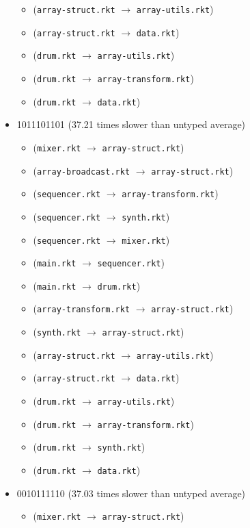 \documentclass{article}
\newcommand{\mono}[1]{\texttt{#1}}
\begin{document}
\begin{itemize}
\begin{itemize}
  \item (\mono{array-struct.rkt} $\rightarrow$ \mono{array-utils.rkt})
  \item (\mono{array-struct.rkt} $\rightarrow$ \mono{data.rkt})
  \item (\mono{drum.rkt} $\rightarrow$ \mono{array-utils.rkt})
  \item (\mono{drum.rkt} $\rightarrow$ \mono{array-transform.rkt})
  \item (\mono{drum.rkt} $\rightarrow$ \mono{data.rkt})
  \end{itemize}
\item 1011101101 (37.21 times slower than untyped average)
  \begin{itemize}
  \item (\mono{mixer.rkt} $\rightarrow$ \mono{array-struct.rkt})
  \item (\mono{array-broadcast.rkt} $\rightarrow$ \mono{array-struct.rkt})
  \item (\mono{sequencer.rkt} $\rightarrow$ \mono{array-transform.rkt})
  \item (\mono{sequencer.rkt} $\rightarrow$ \mono{synth.rkt})
  \item (\mono{sequencer.rkt} $\rightarrow$ \mono{mixer.rkt})
  \item (\mono{main.rkt} $\rightarrow$ \mono{sequencer.rkt})
  \item (\mono{main.rkt} $\rightarrow$ \mono{drum.rkt})
  \item (\mono{array-transform.rkt} $\rightarrow$ \mono{array-struct.rkt})
  \item (\mono{synth.rkt} $\rightarrow$ \mono{array-struct.rkt})
  \item (\mono{array-struct.rkt} $\rightarrow$ \mono{array-utils.rkt})
  \item (\mono{array-struct.rkt} $\rightarrow$ \mono{data.rkt})
  \item (\mono{drum.rkt} $\rightarrow$ \mono{array-utils.rkt})
  \item (\mono{drum.rkt} $\rightarrow$ \mono{array-transform.rkt})
  \item (\mono{drum.rkt} $\rightarrow$ \mono{synth.rkt})
  \item (\mono{drum.rkt} $\rightarrow$ \mono{data.rkt})
  \end{itemize}
\item 0010111110 (37.03 times slower than untyped average)
  \begin{itemize}
  \item (\mono{mixer.rkt} $\rightarrow$ \mono{array-struct.rkt})

\end{itemize}
\end{itemize}
\end{document}
